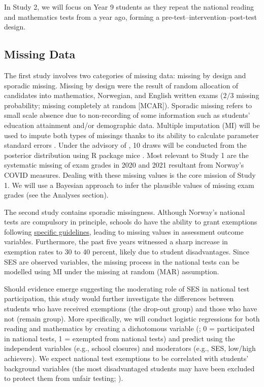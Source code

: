 In Study 2, we will focus on Year 9 students as they repeat the national reading and mathematics tests from a year ago, forming a pre-test--intervention--post-test design.

\subsection{Missing Data}
The first study involves two categories of missing data: missing by design and sporadic missing. Missing by design were the result of random allocation of candidates into mathematics, Norwegian, and English written exams ($2/3$ missing probability; missing completely at random [MCAR]). Sporadic missing refers to small scale absence due to non-recording of some information such as students' education attainment and/or demographic data. Multiple imputation (MI) will be used to impute both types of missings thanks to its ability to calculate parameter standard errors \parencite[][p. 25]{vanbuuren:2018}. Under the advisory of \textcite[][p. 43]{vanbuuren:2018}, 10 draws will be conducted from the posterior distribution using \textsf{R} package \textsf{mice} \parencite{vanbuuren:2011}. Most relevant to Study 1 are the systematic missing of exam grades in 2020 and 2021 resultant from Norway's COVID measures. Dealing with these missing values is the core mission of Study 1. We will use a Bayesian approach to infer the plausible values of missing exam grades (see the Analyses section).

The second study contains sporadic missingness. Although Norway's national tests are compulsory in principle, schools do have the ability to grant exemptions following \href{https://www.ssb.no/en/utdanning/grunnskoler/statistikk/nasjonale-prover}{specific guidelines}, leading to missing values in assessment outcome variables. Furthermore, the past five years witnessed a sharp increase in exemption rates to 30 to 40 percent, likely due to student disadvantages. Since SES are observed variables, the missing process in the national tests can be modelled using MI under the missing at random (MAR) assumption.

Should evidence emerge suggesting the moderating role of SES in national test participation, this study would further investigate the differences between students who have received exemptions (the drop-out group) and those who have not (remain group). More specifically, we will conduct logistic regressions for both reading and mathematics by creating a dichotomous variable (; 0 = participated in national tests, 1 = exempted from national tests) and predict  using the independent variables (e.g., school closures) and moderators (e.g., SES, low/high achievers). We expect national test exemptions to be correlated with students' background variables (the most disadvantaged students may have been excluded to protect them from unfair testing; ).

